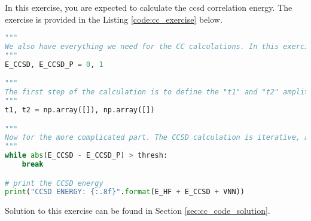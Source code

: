 In this exercise, you are expected to calculate the \acrshort{ccsd} correlation energy. The exercise is provided in the Listing \ref{code:cc_exercise} below.

\raggedbottom\begin{lstlisting}[language=Python, caption={\acrshort{ccsd} exercise code.}, label=code:cc_exercise]
"""
We also have everything we need for the CC calculations. In this exercise, we will calculate the CCSD energy. Since the calculation will be iterative, I define here the CCSD energy as zero, the "E_CCSD_P" variable will be used to monitor convergence.
"""
E_CCSD, E_CCSD_P = 0, 1

"""
The first step of the calculation is to define the "t1" and "t2" amplitudes. These arrays can be initialized as zero arrays with the appropriate dimensions. I will leave this task to you.
"""
t1, t2 = np.array([]), np.array([])

"""
Now for the more complicated part. The CCSD calculation is iterative, and the convergence criterion is set by the "thresh" variable. The while loop should be filled with the appropriate calculations. The calculation of the "t1" and "t2" amplitudes is the most challenging part of the CCSD calculation. After convergence, the "E_CCSD" variable should store the final CCSD energy.
"""
while abs(E_CCSD - E_CCSD_P) > thresh:
    break

# print the CCSD energy
print("CCSD ENERGY: {:.8f}".format(E_HF + E_CCSD + VNN))
\end{lstlisting}

Solution to this exercise can be found in Section \ref{sec:cc_code_solution}.
